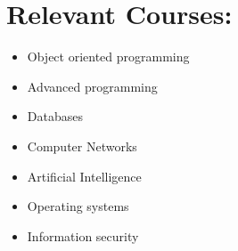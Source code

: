 \documentclass[10pt,a4paper,sans]{moderncv}
\begin{document}
	\section{Relevant Courses:}
		\begin{itemize}

			\vspace{5pt}
			\item{Object oriented programming}
		
			\vspace{2pt}
			\item{Advanced programming}
		
			\vspace{2pt}	
			\item{Databases}
		
			\vspace{2pt}
			\item{Computer Networks}
		
			\vspace{2pt}
			\item{Artificial Intelligence}
		
			\vspace{2pt}
			\item{Operating systems}
		
			\vspace{2pt}
			\item{Information security}

		\end{itemize}
	
	\clearpage
\end{document}

